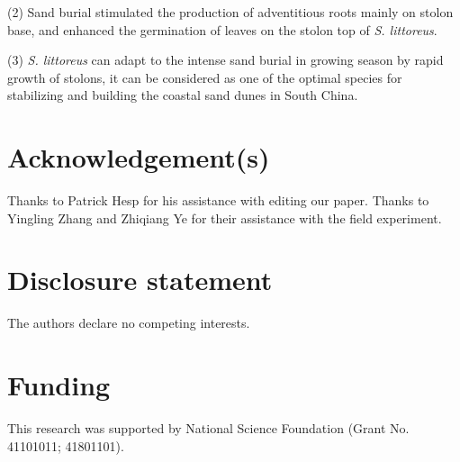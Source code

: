 \documentclass[]{interact}
\theoremstyle{plain}%
\theoremstyle{definition}
\theoremstyle{remark}
\begin{document}
(2) Sand burial stimulated the production of adventitious roots mainly on stolon base, and enhanced the germination of leaves on the stolon top of \textit{S. littoreus}.

(3) \textit{S. littoreus} can adapt to the intense sand burial in growing season by rapid growth of stolons, it can be considered as one of the optimal species for stabilizing and building the coastal sand dunes in South China. 


\section*{Acknowledgement(s)}

Thanks to Patrick Hesp for his assistance with editing our paper. Thanks to Yingling Zhang and Zhiqiang Ye for their assistance with the field experiment.

\section*{Disclosure statement}

The authors declare no competing interests. 

\section*{Funding}

This research was supported by National Science Foundation (Grant No. 41101011; 41801101). 
\end{document}
